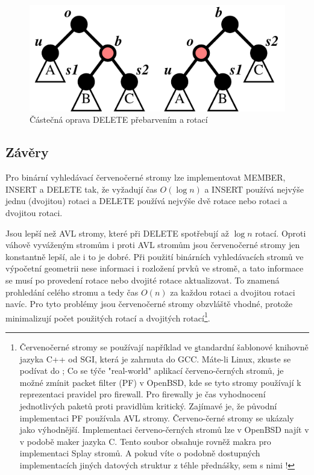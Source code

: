 \begin{samepage}
\begin{enumerate}
\begin{figure}[!htb]
\centering\includegraphics{pics/rbt-d2}
\caption{Částečná oprava DELETE přebarvením a rotací}
\label{rbt-d2}
\end{figure}

\end{enumerate}
\end{samepage}


\subsection{Závěry}
Pro binární vyhledávací červenočerné stromy lze implementovat MEMBER,
INSERT a DELETE tak, že vyžadují čas $O(\log n)$ a INSERT používá
nejvýše jednu (dvojitou) rotaci a DELETE používá nejvýše dvě rotace
nebo rotaci a dvojitou rotaci. 

Jsou lepší než AVL stromy, které při DELETE spotřebují až $\log n$
rotací. Oproti váhově vyváženým stromům i proti AVL stromům jsou 
červenočerné stromy jen
konstantně lepší, ale i to je dobré. Při použití binárních vyhledávacích 
stromů ve výpočetní geometrii nese informaci i rozložení prvků ve stromě, 
a tato informace se musí po provedení rotace nebo dvojité rotace aktualizovat. 
To znamená prohledání celého stromu a tedy čas $O(n)$ za každou rotaci a 
dvojitou rotaci navíc. Pro tyto problémy jsou červenočerné stromy obzvláště 
vhodné, protože minimalizují počet použitých rotací a dvojitých 
rotací\footnote{Červenočerné stromy se používají například ve 
\href{http://www.sgi.com/tech/stl/}%
standardní šablonové knihovně jazyka C++ od SGI, 
která je zahrnuta do GCC. Máte-li Linux, zkuste se podívat do
; 
Co se týče "real-world" aplikací červeno-černých stromů, je možné zmínit
packet filter (PF) v OpenBSD, kde se tyto stromy používají k reprezentaci
pravidel pro firewall. Pro firewally je čas vyhodnocení jednotlivých
paketů proti pravidlům kritický. Zajímavé je, že původní implementaci PF
používala AVL stromy. Červeno-černé stromy se ukázaly jako výhodnější.
Implementaci červeno-černých stromů lze v OpenBSD najít v 
 v podobě maker jazyka C. Tento soubor 
obsahuje rovněž makra pro implementaci Splay stromů.
A pokud víte o podobně dostupných implementacích jiných
datových struktur z téhle přednášky, sem s nimi !}.

